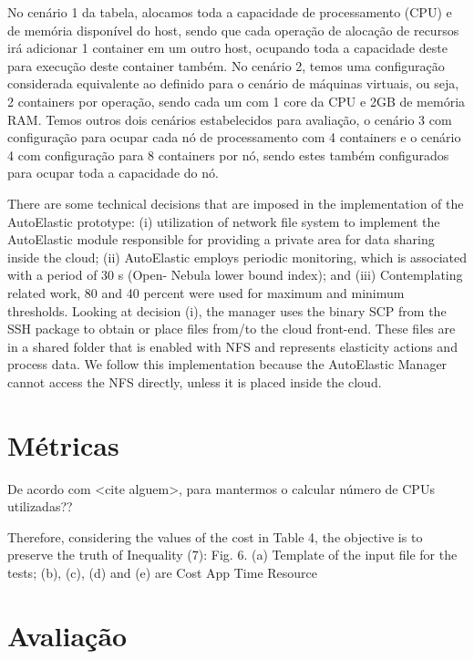 \documentclass[twoside,english,brazilian]{UNISINOSartigo}
\begin{document}
No cenário 1 da tabela, alocamos toda a capacidade de processamento (CPU) e de memória disponível do host, sendo que cada operação de alocação de recursos irá adicionar 1 container em um outro host, ocupando toda a capacidade deste para execução deste container também. No cenário 2, temos uma configuração considerada equivalente ao definido para o cenário de máquinas virtuais, ou seja, 2 containers por operação, sendo cada um com 1 core da CPU e 2GB de memória RAM. Temos outros dois cenários estabelecidos para avaliação, o cenário 3 com configuração para ocupar cada nó de processamento com 4 containers e o cenário 4 com configuração para 8 containers por nó, sendo estes também configurados para ocupar toda a capacidade do nó.





There are some technical decisions that are imposed in
the implementation of the AutoElastic prototype: (i) utilization
of network file system to implement the AutoElastic
module responsible for providing a private area for data
sharing inside the cloud; (ii) AutoElastic employs periodic
monitoring, which is associated with a period of 30 s (Open-
Nebula lower bound index); and (iii) Contemplating related
work, 80 and 40 percent were used for maximum and minimum
thresholds. Looking at decision (i), the manager uses
the binary SCP from the SSH package to obtain or place files
from/to the cloud front-end. These files are in a shared
folder that is enabled with NFS and represents elasticity
actions and process data. We follow this implementation
because the AutoElastic Manager cannot access the NFS
directly, unless it is placed inside the cloud.

\section{Métricas}
\label{metricas}

De acordo com <cite alguem>, para mantermos o 
calcular número de CPUs utilizadas??


Therefore, considering the values of the cost in
Table 4, the objective is to preserve the truth of
Inequality (7):
Fig. 6. (a) Template of the input file for the tests; (b), (c), (d) and (e) are Cost App Time Resource

\section{Avaliação}
\label{avaliacao}
\end{document}
